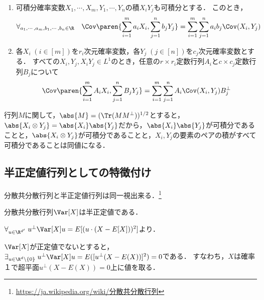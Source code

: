\documentclass[uplatex,dvipdfmx]{jsreport}
\begin{document}
\begin{proposition}[共分散行列の双線型性]\mbox{}
    \begin{enumerate}
        \item 可積分確率変数$X_1,\cdots,X_m,Y_1,\cdots,Y_n$の積$X_iY_j$も可積分とする．
        このとき，
        \[\forall_{a_1,\cdots,a_m,b_1,\cdots,b_n\in\R}\quad\Cov\paren{\sum^m_{i=1}a_iX_i,\sum_{j=1}^nb_jY_j}=\sum^m_{i=1}\sum^n_{j=1}a_ib_j\Cov(X_i,Y_j)\]
        \item 各$X_i\;(i\in[m])$を$r_i$次元確率変数，各$Y_j\;(j\in[n])$を$c_j$次元確率変数とする．
        すべての$X_i,Y_j,X_iY_j\in L^1$のとき，任意の$r\times r_i$定数行列$A_i$と$c\times c_j$定数行列$B_j$について
        \[\Cov\paren{\sum_{i=1}^mA_iX_i,\sum^n_{j=1}B_jY_j}=\sum^m_{i=1}\sum^n_{j=1}A_i\Cov(X_i,Y_j)B_j^\perp\]
    \end{enumerate}
\end{proposition}
\begin{remark}[行列の絶対値]
    行列$M$に関して，$\abs{M}=(\Tr(MM^\perp))^{1/2}$とすると，$\abs{X_i\otimes Y_j}=\abs{X_i}\abs{Y_j}$だから，$\abs{X_i}\abs{Y_j}$が可積分であることと，$\abs{X_i\otimes Y_j}$が可積分であることと，$X_i,Y_j$の要素のペアの積がすべて可積分であることは同値になる．
\end{remark}

\subsection{半正定値行列としての特徴付け}

\begin{tcolorbox}[colframe=ForestGreen, colback=ForestGreen!10!white,breakable,colbacktitle=ForestGreen!40!white,coltitle=black,fonttitle=\bfseries\sffamily,
title=]
    分散共分散行列と半正定値行列は同一視出来る．\footnote{\url{https://ja.wikipedia.org/wiki/分散共分散行列}}
\end{tcolorbox}

\begin{lemma}
    分散共分散行列$\Var[X]$は半正定値である．
\end{lemma}
\begin{Proof}
    $\forall_{u\in\R^{d'}}\;u^\perp\Var[X]u=E[(u\cdot(X-E[X]))^2]$より．
\end{Proof}
\begin{remark}[退化した多次元確率変数]
    $\Var[X]$が正定値でないとすると，$\exists_{u\in\R^d\setminus\{0\}}\;u^\perp\Var[X]u=E([u^\perp(X-E(X))]^2)=0$である．
    すなわち，$X$は確率１で超平面$u^\perp(X-E(X))=0$上に値を取る．
\end{remark}
\end{document}
